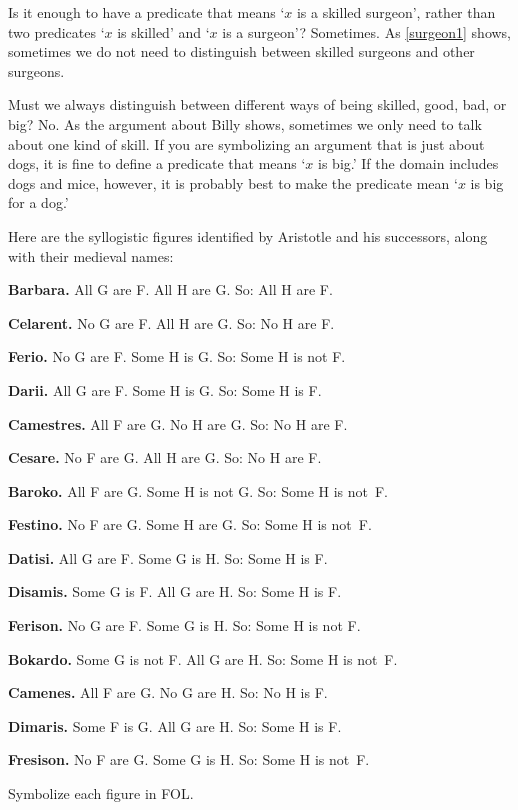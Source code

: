 Is it enough to have a predicate that means `$x$ is a skilled surgeon', rather than two predicates `$x$ is skilled' and `$x$ is a surgeon'? Sometimes. As \cref{surgeon1} shows, sometimes we do not need to distinguish between skilled surgeons and other surgeons.

Must we always distinguish between different ways of being skilled, good, bad, or big? No. As the argument about Billy shows, sometimes we only need to talk about one kind of skill. If you are symbolizing an argument that is just about dogs, it is fine to define a predicate that means `$x$ is big.' If the domain includes dogs and mice, however, it is probably best to make the predicate mean `$x$ is big for a dog.'

\practiceproblems
\problempart
{}\label{pr.BarbaraEtc}
Here are the syllogistic figures identified by Aristotle and his successors, along with their medieval names:
\begin{compactlist}
	\item \textbf{Barbara.} All G are F. All H are G. So:  All H are F.
	\item \textbf{Celarent.} No G are F. All H are G. So: No H are F.
	\item \textbf{Ferio.} No G are F. Some H is G. So: Some H is not F.
	\item \textbf{Darii.} All G are F. Some H is G. So: Some H is F.
	\item \textbf{Camestres.} All F are G. No H are G. So: No H are F.
	\item \textbf{Cesare.} No F are G. All H are G. So: No H are F.
	\item \textbf{Baroko.} All F are G. Some H is not G. So: Some H is not~F.
	\item \textbf{Festino.} No F are G. Some H are G. So: Some H is not~F.
	\item \textbf{Datisi.} All G are F. Some G is H. So: Some H is F.
	\item \textbf{Disamis.} Some G is F. All G are H. So: Some H is F.
	\item \textbf{Ferison.} No G are F. Some G is H. So: Some H is not F.
	\item \textbf{Bokardo.} Some G is not F. All G are H. So:  Some H is not~F.
	\item \textbf{Camenes.} All F are G. No G are H. So: No H is F.
	\item \textbf{Dimaris.} Some F is G. All G are H. So: Some H is F.
	\item \textbf{Fresison.} No F are G. Some G is H. So: Some H is not~F.
\end{compactlist}
Symbolize each figure in FOL.

